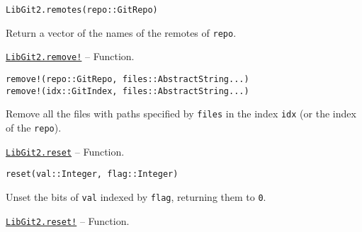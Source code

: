 \begin{adjustwidth}{2em}{0pt}


\begin{verbatim}
LibGit2.remotes(repo::GitRepo)
\end{verbatim}

Return a vector of the names of the remotes of \texttt{repo}.



\end{adjustwidth}
\hypertarget{12673554228490546577}{} 
\hyperlink{12673554228490546577}{\texttt{LibGit2.remove!}}  -- {Function.}

\begin{adjustwidth}{2em}{0pt}


\begin{verbatim}
remove!(repo::GitRepo, files::AbstractString...)
remove!(idx::GitIndex, files::AbstractString...)
\end{verbatim}

Remove all the files with paths specified by \texttt{files} in the index \texttt{idx} (or the index of the \texttt{repo}).



\end{adjustwidth}
\hypertarget{6133575189326240402}{} 
\hyperlink{6133575189326240402}{\texttt{LibGit2.reset}}  -- {Function.}

\begin{adjustwidth}{2em}{0pt}


\begin{verbatim}
reset(val::Integer, flag::Integer)
\end{verbatim}

Unset the bits of \texttt{val} indexed by \texttt{flag}, returning them to \texttt{0}.



\end{adjustwidth}
\hypertarget{6684497681285141047}{} 
\hyperlink{6684497681285141047}{\texttt{LibGit2.reset!}}  -- {Function.}

